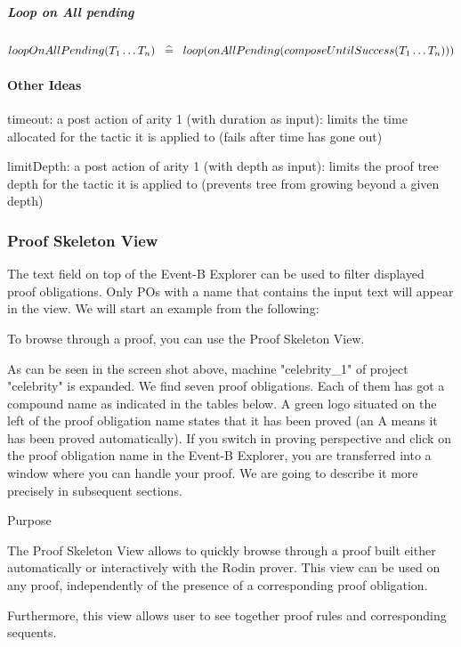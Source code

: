 \subparagraph{Loop on All pending}

$loopOnAllPending(T_1 \ldots T_n) \;\;\mathrel{\widehat=}\;\; loop(onAllPending(composeUntilSuccess(T_1 \ldots T_n)))  $

\paragraph{Other Ideas}

    timeout: a post action of arity 1 (with duration as input): limits the time allocated for the tactic it is applied to (fails after time has gone out)

    limitDepth: a post action of arity 1 (with depth as input): limits the proof tree depth for the tactic it is applied to (prevents tree from growing beyond a given depth) 

\subsubsection{Proof Skeleton View}


The text field on top of the \textsf{Event-B Explorer} can be used to filter displayed proof obligations. Only POs with a name that contains the input text will appear in the view. We will start an example from the following: 

To browse through a proof, you can use the Proof Skeleton View.

As can be seen in the screen shot above, machine "celebrity\_1" of project "celebrity" is expanded. We find seven proof obligations. Each of them has got a compound name as indicated in the tables below. A green logo situated on the left of the proof obligation name states that it has been proved (an A means it has been proved automatically). If you switch in proving perspective and click on the proof obligation name in the Event-B Explorer, you are transferred into a window where you can handle your proof. We are going to describe it more precisely in subsequent sections.



Purpose

The Proof Skeleton View allows to quickly browse through a proof built either automatically or interactively with the Rodin prover. This view can be used on any proof, independently of the presence of a corresponding proof obligation.

Furthermore, this view allows user to see together proof rules and corresponding sequents.

